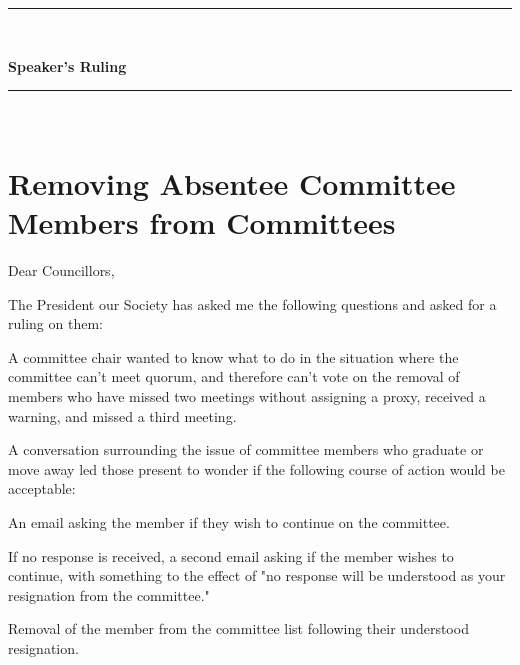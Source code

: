 \begin{center}
\rule{\textwidth}{3.6pt}\\[\baselineskip] %
\begin{Huge}
\textbf{Speaker's Ruling}
\end{Huge}

\rule{\textwidth}{3.6pt}\\[\baselineskip] %



\vspace*{2\baselineskip} %
\end{center}
\section*{Removing Absentee Committee Members from Committees}

Dear Councillors,

The President our Society has asked me the following questions and asked for a ruling on them: 
\begin{longenum}[ label*=\arabic*., align=left]

\item A committee chair wanted to know what to do in the situation where the committee can't meet quorum, and therefore can't vote on the removal of members who have missed two meetings without assigning a proxy, received a warning, and missed a third meeting. 

\item A conversation surrounding the issue of committee members who graduate or move away led those present to wonder if the following course of action would be acceptable:
\begin{longenum}[ label*=\arabic*., align=left]
\item An email asking the member if they wish to continue on the committee.
\item If no response is received, a second email asking if the member wishes to continue, with something to the effect of "no response will be understood as your resignation from the committee."
\item Removal of the member from the committee list following their understood resignation.
\end{longenum}



\end{longenum}	


